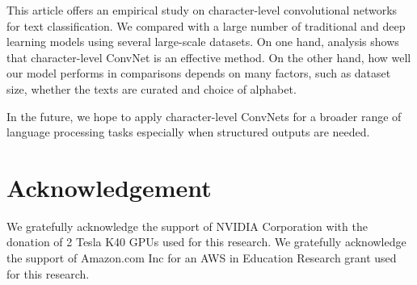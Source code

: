 \documentclass{article} %
\begin{document}
This article offers an empirical study on character-level convolutional networks for text classification. We compared with a large number of traditional and deep learning models using several large-scale datasets. On one hand, analysis shows that character-level ConvNet is an effective method. On the other hand, how well our model performs in comparisons depends on many factors, such as dataset size, whether the texts are curated and choice of alphabet.

In the future, we hope to apply character-level ConvNets for a broader range of language processing tasks especially when structured outputs are needed.

\section*{Acknowledgement}

We gratefully acknowledge the support of NVIDIA Corporation with the donation of 2 Tesla K40 GPUs used for this research. We gratefully acknowledge the support of Amazon.com Inc for an AWS in Education Research grant used for this research.


\small
{}
\end{document}
